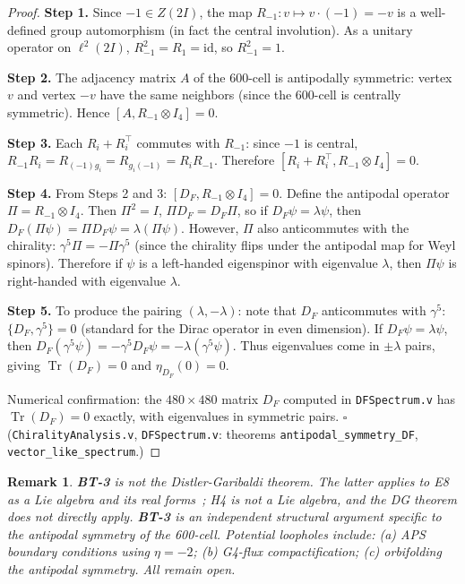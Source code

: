\documentclass[12pt,a4paper]{article}
\newtheorem{remark}[theorem]{Remark}
\newcommand{\TwoI}{2I}
\newcommand{\BT}[1]{\textbf{BT-#1}}
\begin{document}
\begin{proof}
\textbf{Step 1.} Since \(-1 \in Z(\TwoI)\), the map \(R_{-1}: v \mapsto v \cdot (-1) = -v\)
is a well-defined group automorphism (in fact the central involution). As a unitary operator
on \(\ell^2(\TwoI)\), \(R_{-1}^2 = R_1 = \mathrm{id}\), so \(R_{-1}^2 = 1\).

\textbf{Step 2.} The adjacency matrix \(A\) of the 600-cell is antipodally symmetric:
vertex \(v\) and vertex \(-v\) have the same neighbors (since the 600-cell is centrally
symmetric). Hence \([A, R_{-1} \otimes I_4] = 0\).

\textbf{Step 3.} Each \(R_i + R_i^\top\) commutes with \(R_{-1}\):
since \(-1\) is central, \(R_{-1} R_i = R_{(-1) g_i} = R_{g_i(-1)} = R_i R_{-1}\).
Therefore \([R_i + R_i^\top, R_{-1} \otimes I_4] = 0\).

\textbf{Step 4.} From Steps 2 and 3: \([D_F, R_{-1} \otimes I_4] = 0\).
Define the antipodal operator \(\Pi = R_{-1} \otimes I_4\). Then \(\Pi^2 = I\),
\(\Pi D_F = D_F \Pi\), so if \(D_F \psi = \lambda \psi\), then
\(D_F (\Pi\psi) = \Pi D_F \psi = \lambda (\Pi\psi)\).
However, \(\Pi\) also anticommutes with the chirality:
\(\gamma^5 \Pi = -\Pi \gamma^5\) (since the chirality flips under the antipodal map
for Weyl spinors). Therefore if \(\psi\) is a left-handed eigenspinor with eigenvalue
\(\lambda\), then \(\Pi\psi\) is right-handed with eigenvalue \(\lambda\).

\textbf{Step 5.} To produce the pairing \((\lambda, -\lambda)\): note that \(D_F\)
anticommutes with \(\gamma^5\): \(\{D_F, \gamma^5\} = 0\) (standard for the Dirac
operator in even dimension). If \(D_F\psi = \lambda\psi\), then
\(D_F(\gamma^5\psi) = -\gamma^5 D_F \psi = -\lambda(\gamma^5\psi)\).
Thus eigenvalues come in \(\pm\lambda\) pairs, giving \(\operatorname{Tr}(D_F) = 0\)
and \(\eta_{D_F}(0) = 0\).

Numerical confirmation: the \(480 \times 480\) matrix \(D_F\) computed in
\texttt{DFSpectrum.v} has \(\operatorname{Tr}(D_F) = 0\) exactly, with eigenvalues
in symmetric pairs. \(\square\) (\texttt{ChiralityAnalysis.v},
\texttt{DFSpectrum.v}: theorems \texttt{antipodal\_symmetry\_DF},
\texttt{vector\_like\_spectrum}.)
\end{proof}

\begin{remark}
\BT{3} is \emph{not} the Distler-Garibaldi theorem. The latter applies to E8 as a Lie algebra
and its real forms~\cite{Distler:2009dm}; H4 is not a Lie algebra, and the DG theorem does not
directly apply. \BT{3} is an independent structural argument specific to the antipodal symmetry
of the 600-cell. Potential loopholes include: (a) APS boundary conditions using \(\eta = -2\);
(b) G4-flux compactification; (c) orbifolding the antipodal symmetry. All remain open.
\end{remark}
\end{document}
